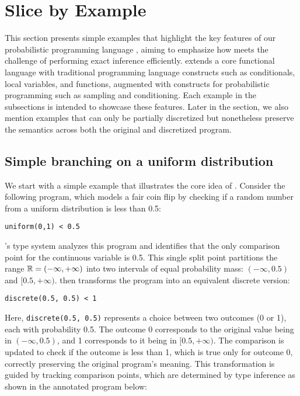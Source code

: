 \section{Slice by Example}\label{sec:examples}
This section presents simple examples that highlight the key features of our probabilistic programming language \Slice{}, aiming to emphasize how \Slice{} meets the challenge of performing exact inference efficiently. \Slice{} extends a core functional language with traditional programming language constructs such as conditionals, local variables, and functions, augmented with constructs for probabilistic programming such as sampling and conditioning. Each example in the subsections is intended to showcase these features. Later in the section, we also mention examples that can only be partially discretized but nonetheless preserve the semantics across both the original and discretized program.

\subsection{Simple branching on a uniform distribution}

We start with a simple example that illustrates the core idea of \Slice{}. Consider the following program, which models a fair coin flip by checking if a random number from a uniform distribution is less than 0.5:

\begin{lstlisting}[aboveskip=1em,belowskip=1em]
    uniform(0,1) < 0.5
\end{lstlisting}

\noindent \Slice{}'s type system analyzes this program and identifies that the only comparison point for the continuous variable is 0.5. This single split point partitions the range $\mathbb{R} = (-\infty, +\infty)$ into two intervals of equal probability mass: $(-\infty, 0.5)$ and $[0.5, +\infty)$. \Slice{} then transforms the program into an equivalent discrete version:

\begin{lstlisting}[aboveskip=1em,belowskip=1em]
    discrete(0.5, 0.5) < 1
\end{lstlisting}

\noindent Here, \texttt{discrete(0.5, 0.5)} represents a choice between two outcomes (0 or 1), each with probability 0.5. The outcome 0 corresponds to the original value being in $(-\infty, 0.5)$, and 1 corresponds to it being in $[0.5, +\infty)$. The comparison is updated to check if the outcome is less than 1, which is true only for outcome 0, correctly preserving the original program's meaning. This transformation is guided by tracking comparison points, which are determined by type inference as shown in the annotated program below:

